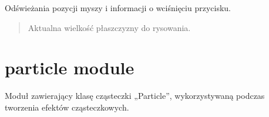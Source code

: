\documentclass[letterpaper,10pt,polish]{sphinxmanual}
\begin{document}
\begin{fulllineitems}
\begin{fulllineitems}
\end{fulllineitems}


\begin{fulllineitems}
\label{\detokenize{mouse:mouse.Mouse.update}}
\pysigstartsignatures
{}
\pysigstopsignatures
\sphinxAtStartPar
Odświeżania pozycji myszy i informacji o wciśnięciu przycisku.
\begin{quote}\begin{description}
\sphinxAtStartPar
{} \textendash{} Aktualna wielkość płaszczyzny do rysowania.

\end{description}\end{quote}

\end{fulllineitems}


\end{fulllineitems}


\sphinxstepscope


\section{particle module}
\label{\detokenize{particle:module-particle}}\label{\detokenize{particle:particle-module}}\label{\detokenize{particle::doc}}
\sphinxAtStartPar
Moduł zawierający klasę cząsteczki „Particle”, wykorzystywaną podczas
tworzenia efektów cząsteczkowych.
\end{document}
